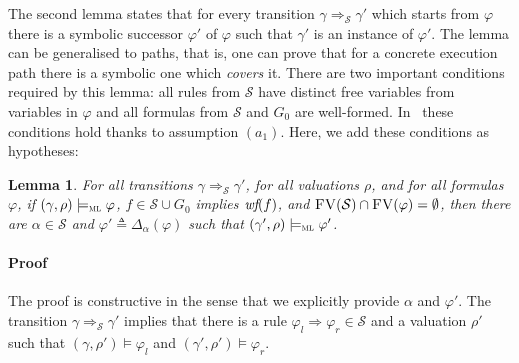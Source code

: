 \documentclass[conference]{IEEEtran}
\newenvironment{todo}{\medskip\hrule\smallskip\noindent}{\smallskip\hrule\medskip}
\newcommand{\vr}[1]{\begin{todo}\textcolor{blue}{Vlad:}\\ \color{orange}{#1}\color{black}\end{todo}}
\newcommand{\vr}[1]{}
\newcommand{\eqbydef}{\triangleq}
\renewcommand{\S}{\mathcal{S}}
\newcommand{\tran}[2]{\Ra^{\!#1}_{\!#2}}
\newcommand{\Ra}{\Rightarrow}
\newcommand{\FreeVars}{\mathit{\textsc{FV}}}
\newcommand{\ML}{\textsc{ml}\xspace}
\newcommand{\rrule}[2]{{#1} \Ra{#2}}
\newcommand{\modelsml}{\models_\ML}
\newcommand{\coq}[1]{{\small \textit{#1}}}
\newtheorem{lemma}{Lemma}
\begin{document}

The second lemma states that for every transition $\gamma \tran{}{\S} \gamma'$ which starts from $\varphi$ there is a symbolic successor $\varphi'$ of $\varphi$ such that $\gamma'$ is an instance of $\varphi'$. 
The lemma can be generalised to  paths, that is, one can prove that for a concrete execution path there is a symbolic one which \emph{covers} it.
There are two important conditions required by this lemma: all rules from $\S$ have distinct free variables from variables in $\varphi$ and all formulas from $\S$ and $G_0$ are well-formed.
In~\cite{lucanu-rusu-arusoaie-nowak-LRC2015} these conditions hold thanks to assumption $(a_1)$. Here, we add these conditions as hypotheses:

\begin{lemma}
\label{lem:coverstep}
For all transitions $\gamma \tran{}{\S} \gamma'$, for all valuations $\rho$, and for all formulas $\varphi$, if  $(\gamma,\rho)\modelsml \varphi$,   $f \in \S \cup G_0$ implies $\coq{wf}(f)$, and $\FreeVars(\S) \cap \FreeVars(\varphi) = \emptyset$,  
then there are $\alpha \in \S$ and  $\varphi' \eqbydef \Delta_{\alpha} (\varphi)$ such that $(\gamma',\rho)\modelsml\varphi'$.
\end{lemma}

\paragraph{Proof}
The proof is constructive in the sense that we explicitly provide $\alpha$ and $\varphi'$.
The transition $\gamma \tran{}{\S} \gamma'$ implies that there is a rule $\rrule{\varphi_l}{\varphi_r}\in \S$ and a valuation $\rho'$ such that $(\gamma, \rho')\models\varphi_l$ and $(\gamma', \rho')\models\varphi_r$. 
\end{document}
